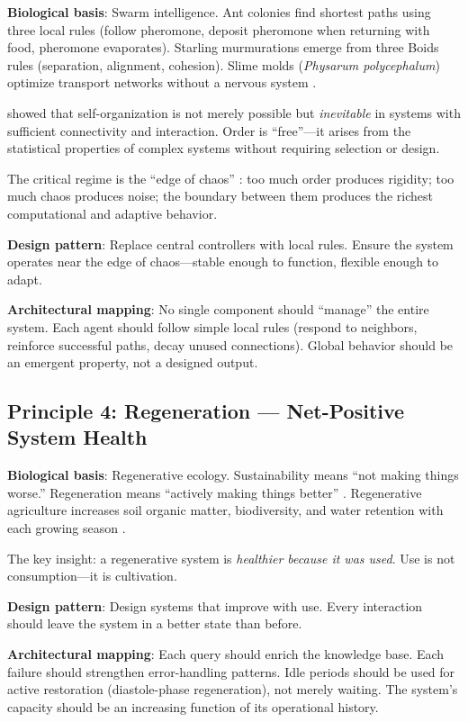 \documentclass[11pt,a4paper]{article}
\begin{document}
\textbf{Biological basis}: Swarm intelligence. Ant colonies find shortest paths using three local rules (follow pheromone, deposit pheromone when returning with food, pheromone evaporates). Starling murmurations emerge from three Boids rules (separation, alignment, cohesion). Slime molds (\emph{Physarum polycephalum}) optimize transport networks without a nervous system \citep{tero2010}.

\citet{kauffman1993} showed that self-organization is not merely possible but \emph{inevitable} in systems with sufficient connectivity and interaction. Order is ``free''---it arises from the statistical properties of complex systems without requiring selection or design.

The critical regime is the ``edge of chaos'' \citep{langton1990}: too much order produces rigidity; too much chaos produces noise; the boundary between them produces the richest computational and adaptive behavior.

\textbf{Design pattern}: Replace central controllers with local rules. Ensure the system operates near the edge of chaos---stable enough to function, flexible enough to adapt.

\textbf{Architectural mapping}: No single component should ``manage'' the entire system. Each agent should follow simple local rules (respond to neighbors, reinforce successful paths, decay unused connections). Global behavior should be an emergent property, not a designed output.

\subsection{Principle 4: Regeneration --- Net-Positive System Health}

\textbf{Biological basis}: Regenerative ecology. Sustainability means ``not making things worse.'' Regeneration means ``actively making things better'' \citep{lyle1994,reed2007}. Regenerative agriculture increases soil organic matter, biodiversity, and water retention with each growing season \citep{brown2018}.

The key insight: a regenerative system is \emph{healthier because it was used}. Use is not consumption---it is cultivation.

\textbf{Design pattern}: Design systems that improve with use. Every interaction should leave the system in a better state than before.

\textbf{Architectural mapping}: Each query should enrich the knowledge base. Each failure should strengthen error-handling patterns. Idle periods should be used for active restoration (diastole-phase regeneration), not merely waiting. The system's capacity should be an increasing function of its operational history.
\end{document}
